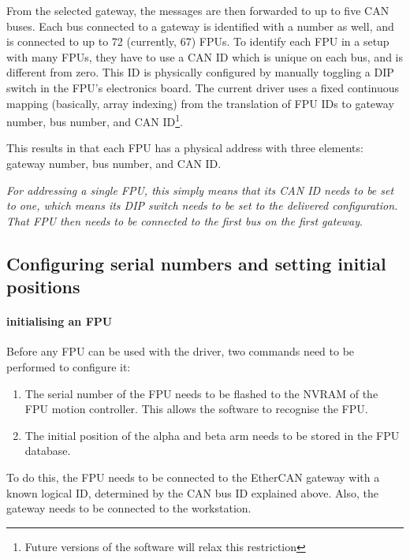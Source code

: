 \documentclass[11pt,a4paper]{scrartcl}
\begin{document}
From the selected gateway, the messages are then forwarded to up to
five CAN buses. Each bus connected to a gateway is identified with a
number as well, and is connected to up to 72 (currently, 67) FPUs.
 To identify each FPU in a setup with many FPUs,
they have to use a CAN ID which is unique on each bus, and is
different from zero. This ID is physically configured by manually
toggling a DIP switch in the FPU's electronics board. The current
driver uses a fixed continuous mapping (basically, array indexing)
from the translation of FPU IDs to gateway number, bus number, and CAN
ID\footnote{Future versions of the software will relax this
  restriction}.

This results in that each FPU has a physical address with three
elements: gateway number, bus number, and CAN ID.

\emph{For addressing a single FPU, this simply means that its CAN ID
  needs to be set to one, which means its DIP switch needs to be set
  to the delivered configuration. That FPU then needs to be connected
  to the first bus on the first gateway}.


\subsection{Configuring serial numbers and setting initial positions}
\label{sec:setinitialposition}

\paragraph{initialising an FPU}

Before any FPU can be used with the driver, two commands
need to be performed to configure it:

\begin{enumerate}
\item The serial number of the FPU needs to be flashed to the
  NVRAM of the FPU motion controller. This allows the software
  to recognise the FPU.
\item The initial position of the alpha and beta arm needs to
  be stored in the FPU database.
\end{enumerate}

To do this, the FPU needs to be connected to the EtherCAN gateway with
a known logical ID, determined by the CAN bus ID explained
above. Also, the gateway needs to be connected to the workstation.
\end{document}
